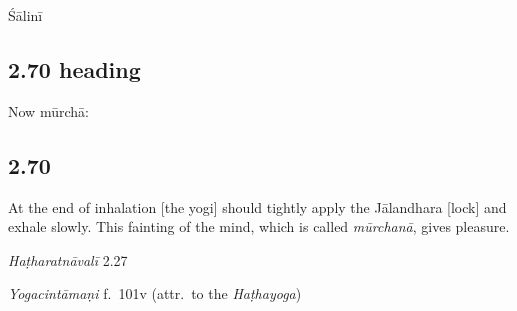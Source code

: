 \begin{ekdosis}
\begin{metre}[hp02_069]
Śālinī 
\end{metre}

\subsection*{2.70 heading}
\begin{translation}[hp02_070a]
Now mūrchā:
\end{translation}


\subsection*{2.70}
\begin{translation}[hp02_070]
At the end of inhalation [the yogi] should tightly apply the Jālandhara [lock] and exhale slowly. This fainting of the mind, which is called \emph{mūrchanā}, gives pleasure.
\end{translation}

\begin{sources}[hp02_070]
\emph{Haṭharatnāvalī} 2.27

\begin{versinnote}
\end{versinnote}

\emph{Yogacintāmaṇi} f.~101v (attr.~to the \emph{Haṭhayoga})

\begin{versinnote}
\end{versinnote}


\end{sources}
\end{ekdosis}
